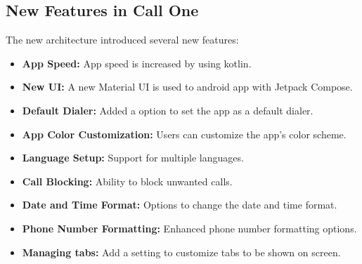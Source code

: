 \subsection{New Features in Call One}\label{subsec:new-features}
The new architecture introduced several new features:
\begin{itemize}
    \item \textbf{App Speed:} App speed is increased by using kotlin.
    \item \textbf{New UI:} A new Material UI is used to android app with Jetpack Compose.
    \item \textbf{Default Dialer: } Added a option to set the app as a default dialer.
    \item \textbf{App Color Customization:} Users can customize the app's color scheme.
    \item \textbf{Language Setup:} Support for multiple languages.
    \item \textbf{Call Blocking:} Ability to block unwanted calls.
    \item \textbf{Date and Time Format:} Options to change the date and time format.
    \item \textbf{Phone Number Formatting:} Enhanced phone number formatting options.
    \item \textbf{Managing tabs:} Add a setting to customize tabs to be shown on screen.
\end{itemize}